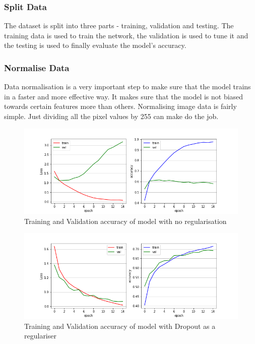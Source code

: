 \documentclass[conference, compsoc]{IEEEtran}
\begin{document}
\subsubsection{Split Data}
The dataset is split into three parts - training, validation and testing. The training data is used to train the network, the validation is used to tune it and the testing is used to finally evaluate the model's accuracy.

\subsubsection{Normalise Data}
Data normalisation is a very important step to make sure that the model trains in a faster and more effective way. It makes sure that the model is not biased towards certain features more than others. Normalising image data is fairly simple. Just dividing all the pixel values by 255 can make do the job.

\begin{figure}
    \centering
    \includegraphics[scale=0.335]{../cifar10_training_val_no_dropout.png}
    \caption{Training and Validation accuracy of model with no regularisation}
    \label{fig:train_no_dropout}
\end{figure}

\begin{figure}
    \centering
    \includegraphics[scale=0.335]{../cifar10_training_val_with_dropout.png}
    \caption{Training and Validation accuracy of model with Dropout as a regulariser}
    \label{fig:train_with_dropout}
\end{figure}
\end{document}
